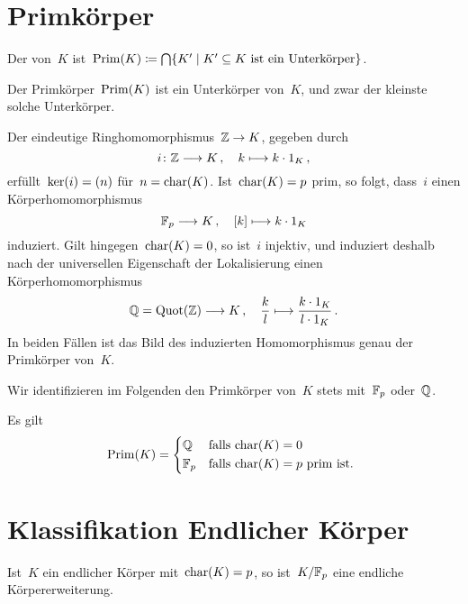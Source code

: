 \section{Primkörper}

\begin{definition}
  Der  von~$K$ ist~$\Prim(K) \defined \bigcap \{ K' \suchthat \text{$K' \subseteq K$ ist ein Unterkörper} \}$.
\end{definition}

\begin{proposition}
  Der Primkörper~$\operatorname{Prim}(K)$ ist ein Unterkörper von~$K$, und zwar der kleinste solche Unterkörper.
\end{proposition}

Der eindeutige Ringhomomorphismus~$\Integer \to K$, gegeben durch
\[
  i
  \colon
  \Integer \to K \,,
  \quad
  k \mapsto k \cdot 1_K \,,
\]
erfüllt~$\ker(i) = (n)$ für~$n = \operatorname{char}(K)$.
Ist~$\operatorname{char}(K) = p$ prim, so folgt, dass~$i$ einen Körperhomomorphismus
\[
  \Finite_p \to K \,,
  \quad
  \class{k} \mapsto k \cdot 1_K
\]
induziert.
Gilt hingegen~$\operatorname{char}(K) = 0$, so ist~$i$ injektiv, und induziert deshalb nach der universellen Eigenschaft der Lokalisierung einen Körperhomomorphismus
\[
  \Rational
  =
  \Quot( \Integer )
  \to
  K \,,
  \quad
  \frac{k}{l}
  \mapsto
  \frac{k \cdot 1_K}{l \cdot 1_K} \,.
\]
In beiden Fällen ist das Bild des induzierten Homomorphismus genau der Primkörper von~$K$.

Wir identifizieren im Folgenden den Primkörper von~$K$ stets mit~$\mathbb{F}_p$ oder~$\mathbb{Q}$.

\begin{corollary}
  Es gilt
  \[
    \Prim(K)
    =
    \begin{cases*}
      \Rational
      &
      falls~$\ringchar(K) = 0$
      \\
      \Finite_p
      &
      falls~$\ringchar(K) = p$ prim ist.
    \end{cases*}
  \]
\end{corollary}





\section{Klassifikation Endlicher Körper}


Ist~$K$ ein endlicher Körper mit~$\operatorname{char}(K) = p$, so ist~$K / \mathbb{F}_p$ eine endliche Körpererweiterung.

